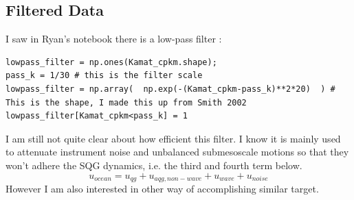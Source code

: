\documentclass[11pt]{article}
\newcommand{\<}{\langle}
\renewcommand{\>}{\rangle}
\begin{document}
    \subsection{Filtered Data}
    I saw in Ryan's notebook there is a low-pass filter : 
    \begin{lstlisting}
lowpass_filter = np.ones(Kamat_cpkm.shape); 
pass_k = 1/30 # this is the filter scale
lowpass_filter = np.array(  np.exp(-(Kamat_cpkm-pass_k)**2*20)  ) # This is the shape, I made this up from Smith 2002
lowpass_filter[Kamat_cpkm<pass_k] = 1
    \end{lstlisting}
    I am still not quite clear about how efficient this filter. I know it is mainly used to attenuate instrument noise and unbalanced submesoscale motions so that they won't adhere the SQG dynamics, i.e. the third and fourth term below.
    \[ u_{ocean} = u_{qg} + u_{aqg, non-wave} + u_{wave} + u_{noise}\]
    However I am also interested in other way of accomplishing similar target. 
\end{document}
